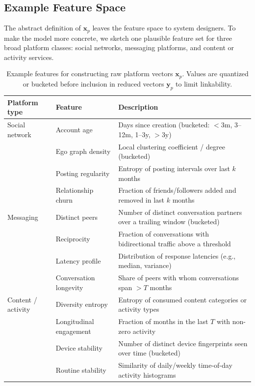 \documentclass[11pt]{article}
\begin{document}
\subsection{Example Feature Space}
\label{sec:feature_space}

The abstract definition of $\mathbf{x}_p$ leaves the feature space to system designers. To make the model more concrete, we sketch one plausible feature set for three broad platform classes: social networks, messaging platforms, and content or activity services.

\begin{table}[h]
  \centering
  \begin{tabular}{p{2.5cm} p{4cm} p{7cm}}
    \hline
    Platform type & Feature & Description \\
    \hline
    Social network &
    Account age &
    Days since creation (bucketed: $<$3m, 3--12m, 1--3y, $>$3y) \\
    &
    Ego graph density &
    Local clustering coefficient / degree (bucketed) \\
    &
    Posting regularity &
    Entropy of posting intervals over last $k$ months \\
    &
    Relationship churn &
    Fraction of friends/followers added and removed in last $k$ months \\
    \hline
    Messaging &
    Distinct peers &
    Number of distinct conversation partners over a trailing window (bucketed) \\
    &
    Reciprocity &
    Fraction of conversations with bidirectional traffic above a threshold \\
    &
    Latency profile &
    Distribution of response latencies (e.g., median, variance) \\
    &
    Conversation longevity &
    Share of peers with whom conversations span $>T$ months \\
    \hline
    Content / activity &
    Diversity entropy &
    Entropy of consumed content categories or activity types \\
    &
    Longitudinal engagement &
    Fraction of months in the last $T$ with non-zero activity \\
    &
    Device stability &
    Number of distinct device fingerprints seen over time (bucketed) \\
    &
    Routine stability &
    Similarity of daily/weekly time-of-day activity histograms \\
    \hline
  \end{tabular}
  \caption{Example features for constructing raw platform vectors $\mathbf{x}_p$. Values are quantized or bucketed before inclusion in reduced vectors $\mathbf{y}_p$ to limit linkability.}
  \label{tab:features}
\end{table}
\end{document}
